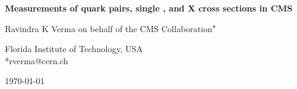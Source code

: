 
\newcommand{\Pmu}{\ensuremath{{\PGm}}\xspace}
\newcommand{\pzvar}{\ensuremath{p_\text{Z}(\Pepm, \PGmmp, j)}\xspace}
\newcommand{\invmassvar}{\ensuremath{m(\Pepm, \PGmmp,j)}\xspace}
\newcommand{\transmassvar}{\ensuremath{m_{\text{T}}(\Pepm, \PGmmp,j,\ptmiss)}\xspace}
\newcommand{\deltaPhiVar}{\ensuremath{\Delta\varphi(\Pepm, \PGmmp)}\xspace}
\newcommand{\ljets}{\ensuremath{\ell + \text{jets}}\xspace}
\newcommand{\dilep}{\ensuremath{2\ell + \text{jets}}\xspace}
\newcommand{\ttjets}{\ensuremath{\ttbar + \text{jets}}\xspace}
\newcommand{\ttgamma}{\ensuremath{\ttbar\gamma}\xspace}
\newcommand{\ttcc}{\ensuremath{\ttbar\PQc\PAQc}\xspace}
\newcommand{\ttcL}{\ensuremath{\ttbar\PQc\text{L}}\xspace}
\newcommand{\ttbb}{\ensuremath{\ttbar\PQb\PAQb}\xspace}
\newcommand{\ttbL}{\ensuremath{\ttbar\PQb\text{L}}\xspace}
\newcommand{\ttLF}{\ensuremath{\ttbar\text{LL}}\xspace}
\newcommand{\ttjj}{\ensuremath{\ttbar\text{jj}}\xspace}
\newcommand{\mujets}{\ensuremath{\PGm + \text{jets}}\xspace}
\newcommand{\ejets}{\ensuremath{\Pe + \text{jets}}\xspace}
\newcommand{\tW}{\ensuremath{\PQt\PW}\xspace}






\begin{center}{\Large \textbf{
Measurements of \PQt quark pairs, single \PQt, and {\ttbar}X cross sections in CMS\\
}}\end{center}
\begin{center}
Ravindra K Verma on behalf of the CMS Collaboration\textsuperscript{$\star$} 
\end{center}
\begin{center}
Florida Institute of Technology, USA 
\\
*rverma@cern.ch 
\end{center}
\begin{center}
\today
\end{center}

